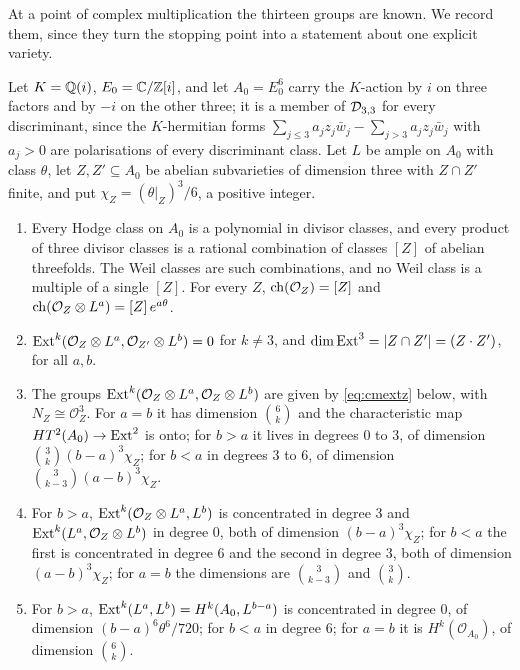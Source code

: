 At a point of complex multiplication the thirteen groups are known. We record them, since they turn the stopping point into a statement about one explicit variety.

\begin{lemma}\label{lem:cmext}
Let $K=\mathbb{Q}(i)$, $E_{0}=\mathbb{C}/\mathbb{Z}[i]$, and let $A_{0}=E_{0}^{6}$ carry the $K$-action by $i$ on three factors and by $-i$ on the other three; it is a member of $\mathcal{D}_{3,3}$ for every discriminant, since the $K$-hermitian forms $\sum_{j\le3}a_{j}z_{j}\bar w_{j}-\sum_{j>3}a_{j}z_{j}\bar w_{j}$ with $a_{j}>0$ are polarisations of every discriminant class. Let $L$ be ample on $A_{0}$ with class $\theta$, let $Z,Z'\subseteq A_{0}$ be abelian subvarieties of dimension three with $Z\cap Z'$ finite, and put $\chi_{Z}=(\theta|_{Z})^{3}/6$, a positive integer.
\begin{enumerate}[label=\textup{(\roman*)},leftmargin=2.4em,itemsep=2pt]
\item Every Hodge class on $A_{0}$ is a polynomial in divisor classes, and every product of three divisor classes is a rational combination of classes $[Z]$ of abelian threefolds. The Weil classes are such combinations, and no Weil class is a multiple of a single $[Z]$. For every $Z$, $\mathrm{ch}(\mathcal{O}_{Z})=[Z]$ and $\mathrm{ch}(\mathcal{O}_{Z}\otimes L^{a})=[Z]\,e^{a\theta}$.
\item $\mathrm{Ext}^{k}(\mathcal{O}_{Z}\otimes L^{a},\mathcal{O}_{Z'}\otimes L^{b})=0$ for $k\ne3$, and $\dim\mathrm{Ext}^{3}=|Z\cap Z'|=(Z\cdot Z')$, for all $a,b$.
\item The groups $\mathrm{Ext}^{k}(\mathcal{O}_{Z}\otimes L^{a},\mathcal{O}_{Z}\otimes L^{b})$ are given by \eqref{eq:cmextz} below, with $N_{Z}\cong\mathcal{O}_{Z}^{3}$. For $a=b$ it has dimension $\binom{6}{k}$ and the characteristic map $HT^{2}(A_{0})\to\mathrm{Ext}^{2}$ is onto; for $b>a$ it lives in degrees $0$ to $3$, of dimension $\binom{3}{k}(b-a)^{3}\chi_{Z}$; for $b<a$ in degrees $3$ to $6$, of dimension $\binom{3}{k-3}(a-b)^{3}\chi_{Z}$.
\item For $b>a$, $\mathrm{Ext}^{k}(\mathcal{O}_{Z}\otimes L^{a},L^{b})$ is concentrated in degree $3$ and $\mathrm{Ext}^{k}(L^{a},\mathcal{O}_{Z}\otimes L^{b})$ in degree $0$, both of dimension $(b-a)^{3}\chi_{Z}$; for $b<a$ the first is concentrated in degree $6$ and the second in degree $3$, both of dimension $(a-b)^{3}\chi_{Z}$; for $a=b$ the dimensions are $\binom{3}{k-3}$ and $\binom{3}{k}$.
\item For $b>a$, $\mathrm{Ext}^{k}(L^{a},L^{b})=H^{k}(A_{0},L^{b-a})$ is concentrated in degree $0$, of dimension $(b-a)^{6}\theta^{6}/720$; for $b<a$ in degree $6$; for $a=b$ it is $H^{k}(\mathcal{O}_{A_{0}})$, of dimension $\binom{6}{k}$.
\end{enumerate}
\end{lemma}


